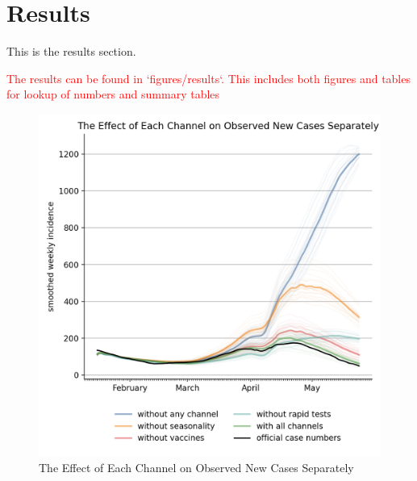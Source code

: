 \section{Results}
\label{sec:results}

This is the results section.

\textcolor{red}{The results can be found in `figures/results`. This includes both figures
and tables for lookup of numbers and summary tables}


\begin{figure}[ht]
    \centering
    \includegraphics[width=0.9 \textwidth]{../figures/results/figures/comparisons/one_off_and_combined/full_new_known_case}
    \caption{The Effect of Each Channel on Observed New Cases Separately}
    \label{fig:}
    \figurenotes{\textcolor{red}{\ldots}}
\end{figure}

